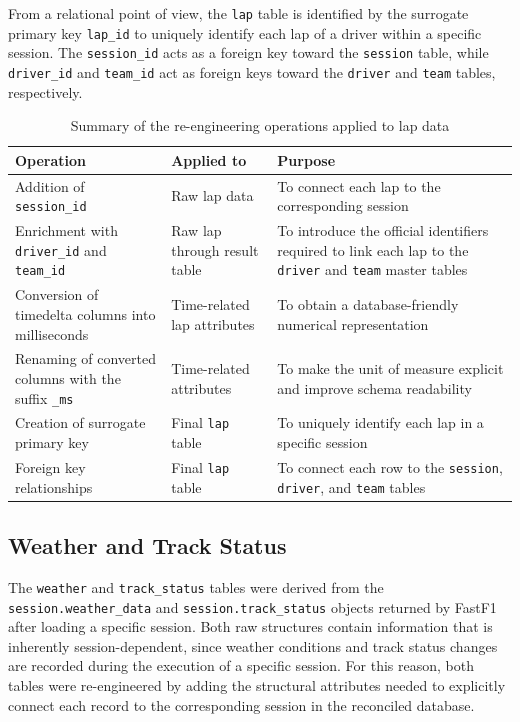 \documentclass[12pt,a4paper]{article}
\begin{document}
	From a relational point of view, the \texttt{lap} table is identified by the surrogate primary key \texttt{lap\_id} to uniquely identify each lap of a driver within a specific session.
	The \texttt{session\_id} acts as a foreign key toward the \texttt{session} table, while \texttt{driver\_id} and \texttt{team\_id} act as foreign keys toward the \texttt{driver} and \texttt{team} tables, respectively.
	
	\begin{table}[H]
		\centering
		\caption{Summary of the re-engineering operations applied to lap data}
		\renewcommand{\arraystretch}{1.2}
		\begin{tabularx}{\textwidth}{>{\raggedright\arraybackslash}p{4.1cm} >{\raggedright\arraybackslash}p{3.2cm} >{\raggedright\arraybackslash}X}
			\toprule
			\textbf{Operation} & \textbf{Applied to} & \textbf{Purpose} \\
			\midrule
			Addition of \texttt{session\_id} & Raw lap data & To connect each lap to the corresponding session\\
			\addlinespace
			Enrichment with \texttt{driver\_id} and \texttt{team\_id} & Raw lap through result table & To introduce the official identifiers required to link each lap to the \texttt{driver} and \texttt{team} master tables \\
			\addlinespace
			Conversion of timedelta columns into milliseconds & Time-related lap attributes & To obtain a database-friendly numerical representation \\
			\addlinespace
			Renaming of converted columns with the suffix \texttt{\_ms} & Time-related attributes & To make the unit of measure explicit and improve schema readability \\
			\addlinespace
			Creation of surrogate primary key & Final \texttt{lap} table & To uniquely identify each lap in a specific session \\
			\addlinespace
			Foreign key relationships & Final \texttt{lap} table & To connect each row to the \texttt{session}, \texttt{driver}, and \texttt{team} tables \\
			\bottomrule
		\end{tabularx}
	\end{table}
	
	
	\subsection{Weather and Track Status}
	
	The \texttt{weather} and \texttt{track\_status} tables were derived from the \texttt{session.weather\_data} and \texttt{session.track\_status} objects returned by FastF1 after loading a specific session.
	Both raw structures contain information that is inherently session-dependent, since weather conditions and track status changes are recorded during the execution of a specific session.
	For this reason, both tables were re-engineered by adding the structural attributes needed to explicitly connect each record to the corresponding session in the reconciled database.
	
\end{document}
